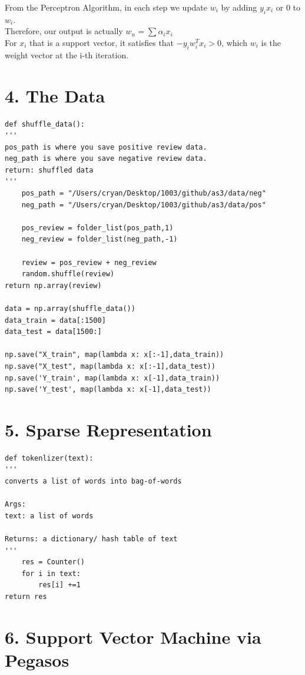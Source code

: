 \documentclass{article}
\newenvironment{sub}[2][$-$]{\begin{trivlist}
		\item[\hskip \labelsep {\bfseries #1}\hskip \labelsep {\bfseries #2.}]}  {\end{trivlist}}
\begin{document}
\begin{sub}{3.3}
\end{sub}
From the Perceptron Algorithm, in each step we update $w_i$ by adding $y_ix_i$ or 0 to $w_i$. \\Therefore, our output is actually $w_n = \sum \alpha_i x_i$\\
For $x_i$ that is a support vector, it satisfies that $-y_iw_i^Tx_i >0$, which $w_i$ is the weight vector at the i-th iteration. 


\section{4. The Data}
\begin{verbatim}
def shuffle_data():
'''
pos_path is where you save positive review data.
neg_path is where you save negative review data.
return: shuffled data
'''
	pos_path = "/Users/cryan/Desktop/1003/github/as3/data/neg"
	neg_path = "/Users/cryan/Desktop/1003/github/as3/data/pos"
	
	pos_review = folder_list(pos_path,1)
	neg_review = folder_list(neg_path,-1)
	
	review = pos_review + neg_review
	random.shuffle(review)
return np.array(review)

data = np.array(shuffle_data())
data_train = data[:1500]
data_test = data[1500:]

np.save("X_train", map(lambda x: x[:-1],data_train))
np.save("X_test", map(lambda x: x[:-1],data_test))
np.save('Y_train', map(lambda x: x[-1],data_train))
np.save('Y_test', map(lambda x: x[-1],data_test))

\end{verbatim}

\section{5. Sparse Representation}

\begin{verbatim}
def tokenlizer(text):
'''
converts a list of words into bag-of-words

Args:
text: a list of words

Returns: a dictionary/ hash table of text
'''
	res = Counter()
	for i in text:
		res[i] +=1
return res
\end{verbatim}

\pagebreak

\section{6. Support Vector Machine via Pegasos}
\end{document}
